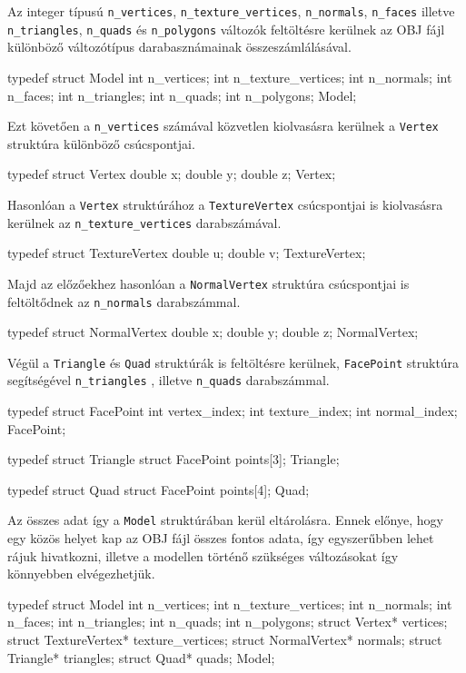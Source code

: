 Az integer típusú \texttt{n\_vertices}, \texttt{n\_texture\_vertices}, \texttt{n\_normals}, \texttt{n\_faces} illetve \texttt{n\_triangles}, \texttt{n\_quads} és \texttt{n\_polygons} változók feltöltésre kerülnek az OBJ fájl különböző változótípus darabasznámainak összeszámlálásával.
\begin{python}
typedef struct Model
{
    int n_vertices;
    int n_texture_vertices;
    int n_normals;
    int n_faces;
    int n_triangles;
    int n_quads;
    int n_polygons;
} Model;
\end{python}
Ezt követően a \texttt{n\_vertices} számával közvetlen kiolvasásra kerülnek a \texttt{Vertex} struktúra különböző csúcspontjai.
\begin{python} 
typedef struct Vertex
{
    double x;
    double y;
    double z;
} Vertex;
\end{python}
Hasonlóan a \texttt{Vertex} struktúrához a \texttt{TextureVertex} csúcspontjai is kiolvasásra kerülnek az \texttt{n\_texture\_vertices} darabszámával.
\begin{python}
typedef struct TextureVertex
{
    double u;
    double v;
} TextureVertex;
\end{python}
Majd az előzőekhez hasonlóan a \texttt{NormalVertex}  struktúra csúcspontjai is feltöltődnek az \texttt{n\_normals} darabszámmal.
\begin{python}
typedef struct NormalVertex
{
    double x;
    double y;
    double z;
} NormalVertex;
\end{python}
Végül a \texttt{Triangle} és \texttt{Quad} struktúrák is feltöltésre kerülnek, \texttt{FacePoint} struktúra segítségével \texttt{n\_triangles} , illetve \texttt{n\_quads} darabszámmal.
\begin{python}
typedef struct FacePoint
{
    int vertex_index;
    int texture_index;
    int normal_index;
} FacePoint;

typedef struct Triangle
{
    struct FacePoint points[3];
} Triangle;

typedef struct Quad
{
    struct FacePoint points[4];
} Quad;
\end{python}
Az összes adat így a \texttt{Model} struktúrában kerül eltárolásra. Ennek előnye, hogy egy közös helyet kap az OBJ fájl összes fontos adata, így egyszerűbben lehet rájuk hivatkozni, illetve a modellen történő szükséges változásokat így könnyebben elvégezhetjük.
\begin{python}
typedef struct Model
{
    int n_vertices;
    int n_texture_vertices;
    int n_normals;
    int n_faces;
    int n_triangles;
    int n_quads;
    int n_polygons;
    struct Vertex* vertices;
    struct TextureVertex* texture_vertices;
    struct NormalVertex* normals;
    struct Triangle* triangles;
    struct Quad* quads;
}Model;
\end{python}

